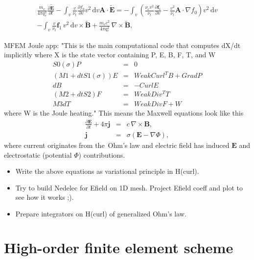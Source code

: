 \documentclass[preprint,12pt]{elsarticle}
\newcommand{\pdv}[2]{\frac{\partial{#1}}{\partial{#2}}}
\newcommand{\vect}[1]{\boldsymbol{#1}}
\newcommand{\matr}[1]{\mathbf{#1}}
\newcommand{\dI}{\text{d}}
\newcommand{\nue}{\nu_{e}}
\newcommand{\nutot}{\nu_{t}}
\newcommand{\vmag}{v}
\newcommand{\E}{\vect{E}}
\newcommand{\B}{\vect{B}}
\newcommand{\tE}{\vect{\tilde{E}}}
\newcommand{\tB}{\vect{\tilde{B}}}
\newcommand{\qe}{q_e}
\newcommand{\me}{m_e}
\newcommand{\fzero}{f_0}
\newcommand{\fone}{\vect{f}_1}
\newcommand{\MA}{\matr{A}}
\newcommand{\intv}{\int_{\vmag}}
\newcounter{bla}
\begin{document}
\begin{multline}
  \frac{\me}{4\pi\qe^2}\pdv{\tE}{t} 
  - \intv\frac{\vmag}{\nutot} \pdv{\fzero}{\vmag}\vmag^2\, \dI\vmag \MA\cdot\tE 
   = 
  - \intv\left( 
  \frac{\nue\vmag^2}{\nutot}\pdv{\fone}{\vmag}
  - \frac{\vmag^2}{\nutot}\MA\cdot\nabla\fzero\right)\vmag^2\, \dI\vmag  \\
  - \intv \frac{\vmag}{\nutot}\fone\, \vmag^2\, \dI\vmag \times\tB
  + \frac{\me c^2}{4\pi\qe^2}\, \nabla\times\tB ,
  \label{eq:GeneralizedOhm} 
\end{multline}

MFEM Joule app:
"This is the main computational code that computes dX/dt implicitly
where X is the state vector containing P, E, B, F, T, and W
\begin{eqnarray}
  S0(\sigma) P &=& 0 \\
  (M1+dt S1(\sigma)) E &=& WeakCurl^T B + Grad P \\
  dB &=& -Curl E \\
  (M2+dt S2) F &=& WeakDiv^T T \\
  M3 dT &=& WeakDiv F + W
\end{eqnarray}
where W is the Joule heating."
This means the Maxwell equations look like this
\begin{eqnarray}
  \pdv{\E}{t} + 4\pi\vect{j} &=& c\, \nabla\times\B , 
  \nonumber \\
  \vect{j} &=& \sigma\left(\E - \nabla\Phi\right) ,
  \nonumber
\end{eqnarray}
where current originates from the~Ohm's law and electric field has induced $\E$ and 
electrostatic (potential $\Phi$) contributions.


\begin{itemize}
  \item Write the above equations as variational principle in H(curl).
  \item Try to build Nedelec for Efield on 1D mesh. Project Efield coeff and plot to see how it works ;).
  \item Prepare integrators on H(curl) of generalized Ohm's law.
\end{itemize}

\section{High-order finite element scheme}\label{sec:hos}
\end{document}
